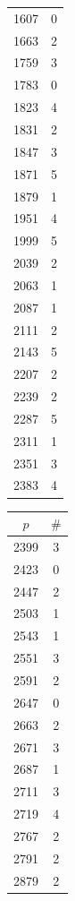 \documentclass{article}
\theoremstyle{definition}
\begin{document}
\begin{table}[htbp]
\begin{minipage}{0.135\textwidth}
\begin{tabular}{c|c}
        1607 & 0 \\
        1663 & 2 \\
        1759 & 3 \\
        1783 & 0 \\
        1823 & 4 \\
        1831 & 2 \\
        1847 & 3 \\
        1871 & 5 \\
        1879 & 1 \\
        1951 & 4 \\
        1999 & 5 \\
        2039 & 2 \\
        2063 & 1 \\
        2087 & 1 \\
        2111 & 2 \\
        2143 & 5 \\
        2207 & 2 \\
        2239 & 2 \\
        2287 & 5 \\
        2311 & 1 \\
        2351 & 3 \\
        2383 & 4
    \end{tabular}
\end{minipage}\hspace{-2mm}
%
\begin{minipage}{0.135\textwidth}
    \centering
    \begin{tabular}{c|c}
        $p$ & $\#$ \\ \hline
        2399 & 3 \\
        2423 & 0 \\
        2447 & 2 \\
        2503 & 1 \\
        2543 & 1 \\
        2551 & 3 \\
        2591 & 2 \\
        2647 & 0 \\
        2663 & 2 \\
        2671 & 3 \\
        2687 & 1 \\
        2711 & 3 \\
        2719 & 4 \\
        2767 & 2 \\
        2791 & 2 \\
        2879 & 2 \\

\end{tabular}
\end{minipage}
\end{table}
\end{document}
